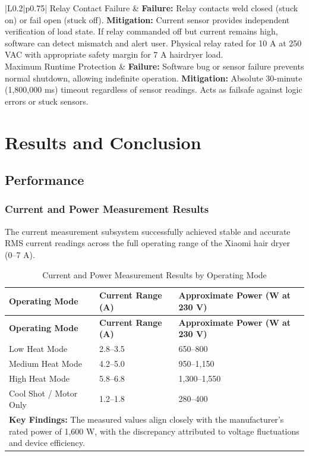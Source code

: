 \documentclass[11pt,a4paper]{article}
\begin{document}
\begin{longtable}{|L{0.2\textwidth}|p{0.75\textwidth}|}
\hline
Relay Contact Failure & \textbf{Failure:} Relay contacts weld closed (stuck on) or fail open (stuck off). \newline \textbf{Mitigation:} Current sensor provides independent verification of load state. If relay commanded off but current remains high, software can detect mismatch and alert user. Physical relay rated for 10 A at 250 VAC with appropriate safety margin for 7 A hairdryer load. \\
\hline
Maximum Runtime Protection & \textbf{Failure:} Software bug or sensor failure prevents normal shutdown, allowing indefinite operation. \newline \textbf{Mitigation:} Absolute 30-minute (1,800,000 ms) timeout regardless of sensor readings. Acts as failsafe against logic errors or stuck sensors. \\
\hline
\end{longtable}

\newpage
\section{Results and Conclusion}

\subsection{Performance}

\subsubsection*{Current and Power Measurement Results}

The current measurement subsystem successfully achieved stable and accurate RMS current readings across the full operating range of the Xiaomi hair dryer (0--7 A).

\begin{longtable}{|p{}|p{}|p{}|}
\caption{Current and Power Measurement Results by Operating Mode}
\label{tab:current_power_results} \\
\hline
\textbf{Operating Mode} & \textbf{Current Range (A)} & \textbf{Approximate Power (W at 230 V)} \\
\hline
\endfirsthead
\hline
\textbf{Operating Mode} & \textbf{Current Range (A)} & \textbf{Approximate Power (W at 230 V)} \\
\hline
\endhead
\hline
\endfoot
\hline
\endlastfoot
Low Heat Mode & 2.8--3.5 & 650--800 \\
\hline
Medium Heat Mode & 4.2--5.0 & 950--1,150 \\
\hline
High Heat Mode & 5.8--6.8 & 1,300--1,550 \\
\hline
Cool Shot / Motor Only & 1.2--1.8 & 280--400 \\
\hline
\multicolumn{3}{|p{0.92\textwidth}|}{\textbf{Key Findings:} The measured values align closely with the manufacturer's rated power of 1,600 W, with the discrepancy attributed to voltage fluctuations and device efficiency.} \\
\hline
\end{longtable}
\end{document}
